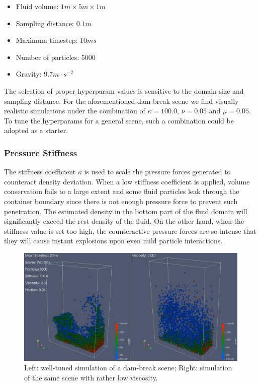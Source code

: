 \documentclass[
	11pt, 
	DIV10,
	ngerman,
	a4paper, 
	oneside, 
	headings=normal, 
	captions=tableheading,
	final, 
	numbers=noenddot
]{scrartcl}
\begin{document}
\begin{itemize}
    \item Fluid volume: $ 1m \times 5m \times 1m $
    \item Sampling distance: $ 0.1m $
    \item Maximum timestep: $ 10ms $
    \item Number of particles: $ 5000 $
    \item Gravity: $ 9.7m \cdot s^{-2} $
\end{itemize}

The selection of proper hyperparam values is sensitive to the domain size and sampling distance. For the aforementioned dam-break scene we find visually realistic simulations under the combination of $ \kappa = 100.0 $, $ \nu = 0.05 $ and $ \mu = 0.05 $. To tune the hyperparams for a general scene, such a combination could be adopted as a starter.

\subsubsection{Pressure Stiffness}

The stiffness coefficient $ \kappa $ is used to scale the pressure forces generated to counteract density deviation. When a low stiffness coefficient is applied, volume conservation fails to a large extent and some fluid particles leak through the container boundary since there is not enough pressure force to prevent such penetration. The estimated density in the bottom part of the fluid domain will significantly exceed the rest density of the fluid. On the other hand, when the stiffness value is set too high, the counteractive pressure forces are so intense that they will cause instant explosions upon even mild particle interactions.

\begin{figure}[h]
    \centering
    \includegraphics[width=.6\textwidth]{pics/wcsph_viscosity.png}
    \caption{Left: well-tuned simulation of a dam-break scene; Right: simulation of the same scene with rather low viscosity.}
    \label{fig:visco}
\end{figure}
\end{document}
